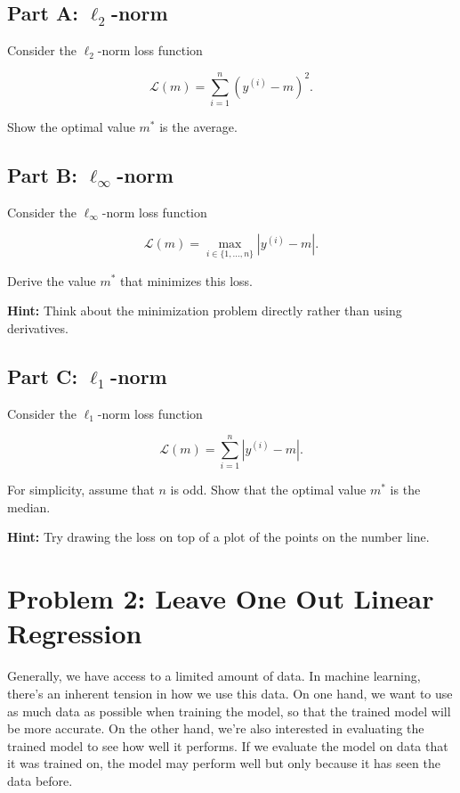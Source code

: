 \documentclass{article}
\begin{document}
\subsection*{Part A: $\ell_2$-norm}

Consider the $\ell_2$-norm loss function

$$
\mathcal{L}(m) = \sum_{i=1}^n (y^{(i)} - m)^2.
$$

Show the optimal value $m^*$ is the average.

\subsection*{Part B: $\ell_\infty$-norm}

Consider the $\ell_\infty$-norm loss function

$$
\mathcal{L}(m) = \max_{i \in \{1, \ldots, n\}} |y^{(i)} - m|.
$$

Derive the value $m^*$ that minimizes this loss.

\textbf{Hint:} Think about the minimization problem directly rather than using derivatives.

\subsection*{Part C: $\ell_1$-norm}

Consider the $\ell_1$-norm loss function

$$
\mathcal{L}(m) = \sum_{i=1}^n |y^{(i)} - m|.
$$

For simplicity, assume that $n$ is odd.
Show that the optimal value $m^*$ is the median.

\textbf{Hint:} Try drawing the loss on top of a plot of the points on the number line.

%
\newpage
\section*{Problem 2: Leave One Out Linear Regression}

Generally, we have access to a limited amount of data.
In machine learning, there's an inherent tension in how we use this data.
On one hand, we want to use as much data as possible when training the model, so that the trained model will be more accurate.
On the other hand, we're also interested in evaluating the trained model to see how well it performs.
If we evaluate the model on data that it was trained on, the model may perform well but only because it has seen the data before.
\end{document}

